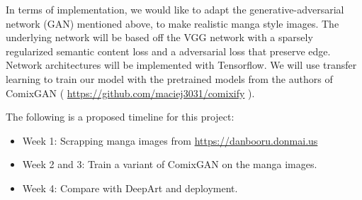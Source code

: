 \documentclass{article}
\begin{document}
In terms of implementation, we would like to adapt the generative-adversarial network (GAN) mentioned above, to make realistic manga style images. The underlying network will be based off the VGG network with a sparsely regularized semantic content loss and a adversarial loss that preserve edge. Network architectures will be implemented with Tensorflow. We will use transfer learning to train our model with the pretrained models from the authors of ComixGAN ( \url{https://github.com/maciej3031/comixify} ).

The following is a proposed timeline for this project:
\begin{itemize}
  \item Week 1: Scrapping manga images from \url{https://danbooru.donmai.us}
  \item Week 2 and 3: Train a variant of ComixGAN on the manga images.
  \item Week 4: Compare with DeepArt and deployment.
\end{itemize}



\medskip
\end{document}
